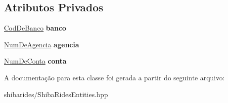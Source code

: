 \subsection*{Atributos Privados}
\begin{DoxyCompactItemize}
\item 
\hyperlink{classshibarides_1_1CodDeBanco}{Cod\+De\+Banco} {\bfseries banco}\hypertarget{classshibarides_1_1Conta_ad031588506d0bf260dc3dd945a3122d5}{}\label{classshibarides_1_1Conta_ad031588506d0bf260dc3dd945a3122d5}

\item 
\hyperlink{classshibarides_1_1NumDeAgencia}{Num\+De\+Agencia} {\bfseries agencia}\hypertarget{classshibarides_1_1Conta_a5044c610a85f15134610a24950aafcfd}{}\label{classshibarides_1_1Conta_a5044c610a85f15134610a24950aafcfd}

\item 
\hyperlink{classshibarides_1_1NumDeConta}{Num\+De\+Conta} {\bfseries conta}\hypertarget{classshibarides_1_1Conta_ae12fee41eb7e060e2cf05b1029cde41f}{}\label{classshibarides_1_1Conta_ae12fee41eb7e060e2cf05b1029cde41f}

\end{DoxyCompactItemize}


A documentação para esta classe foi gerada a partir do seguinte arquivo\+:\begin{DoxyCompactItemize}
\item 
shibarides/Shiba\+Rides\+Entities.\+hpp\end{DoxyCompactItemize}
